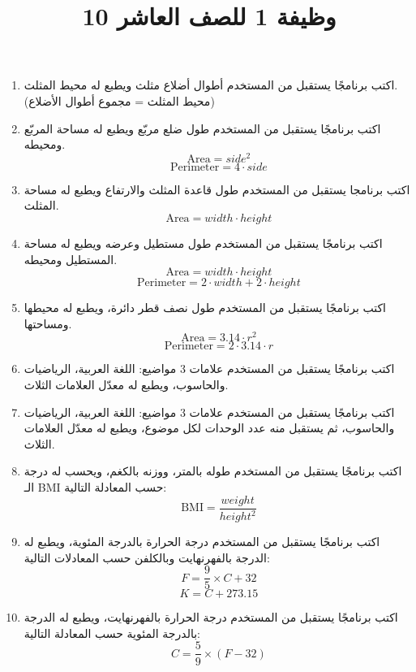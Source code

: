 \documentclass[12pt]{article}
\title{وظيفة 1 للصف العاشر 10}
\begin{document}
\maketitle
\thispagestyle{fancy}

\begin{enumerate}

\item
اكتب برنامجًا يستقبل من المستخدم أطوال أضلاع مثلث ويطبع له محيط المثلث. \\
(محيط المثلث = مجموع أطوال الأضلاع)

\item
اكتب برنامجًا يستقبل من المستخدم طول ضلع مربّع ويطبع له مساحة المربّع ومحيطه.
$$ \text{Area} = side ^ 2 $$
$$ \text{Perimeter} = 4 \cdot side $$

\item
اكتب برنامجا يستقبل من المستخدم طول قاعدة المثلث والارتفاع ويطبع له مساحة المثلث.
$$ \text{Area} = width \cdot height $$

\item
اكتب برنامجًا يستقبل من المستخدم طول مستطيل وعرضه ويطبع له مساحة المستطيل ومحيطه.
$$ \text{Area} = width \cdot height $$
$$ \text{Perimeter} = 2 \cdot width + 2 \cdot height $$

\item
اكتب برنامجًا يستقبل من المستخدم طول نصف قطر دائرة، ويطبع له محيطها ومساحتها.
$$ \text{Area} = 3.14 \cdot r^2 $$
$$ \text{Perimeter} = 2 \cdot 3.14 \cdot r $$

\item
اكتب برنامجًا يستقبل من المستخدم علامات 3 مواضيع: اللغة العربية، الرياضيات والحاسوب، ويطبع له معدّل العلامات الثلاث.

\item
اكتب برنامجًا يستقبل من المستخدم علامات 3 مواضيع: اللغة العربية، الرياضيات والحاسوب، ثم يستقبل منه عدد الوحدات لكل موضوع، ويطبع له معدّل العلامات الثلاث.

\item
اكتب برنامجًا يستقبل من المستخدم طوله بالمتر، ووزنه بالكغم، ويحسب له درجة الـ BMI حسب المعادلة التالية:
$$ \text{BMI} = \frac{weight}{height^2} $$

\item
اكتب برنامجًا يستقبل من المستخدم درجة الحرارة بالدرجة المئوية، ويطبع له الدرجة بالفهرنهايت وبالكلفن حسب المعادلات التالية:
$$ F = \frac{9}{5} \times C + 32 $$
$$ K = C + 273.15 $$

\item
اكتب برنامجًا يستقبل من المستخدم درجة الحرارة بالفهرنهايت، ويطبع له الدرجة بالدرجة المئوية حسب المعادلة التالية:
$$ C = \frac{5}{9} \times (F - 32) $$


\end{enumerate}
\end{document}
